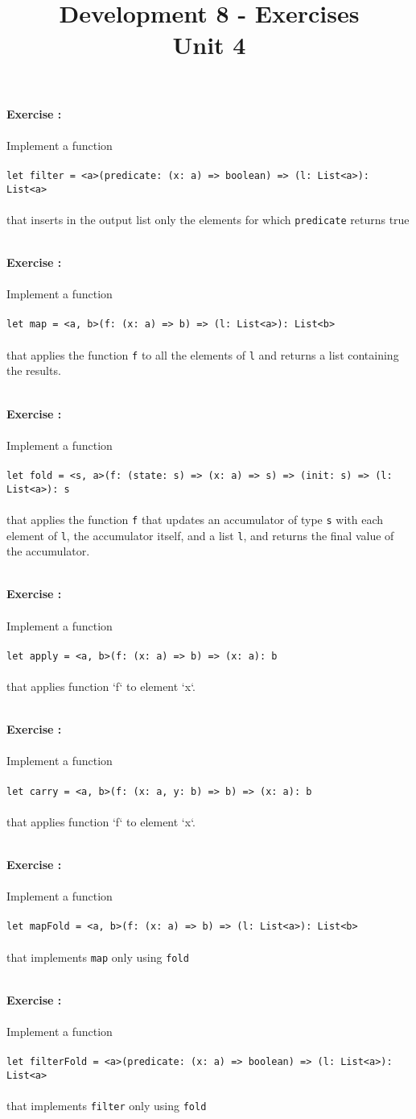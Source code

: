 \documentclass[]{article}
\title{Development 8 - Exercises\\Unit 4}
\author{}
\date{}
\newcounter{ExerciseCount}
\newcommand{\functionEx}[3]{
  Implement a function\\\\
   \texttt{let #1 = #2}\\\\ #3
}
\newcommand{\exercise}[1]{\noindent \textbf{Exercise \theExerciseCount:}\\\\ #1 \addtocounter{ExerciseCount}{1}
}
\begin{document}
\maketitle

\noindent


\exercise{
  \functionEx{filter}{<a>(predicate: (x: a) => boolean) => (l: List<a>): List<a>}{
    that inserts in the output list only the elements for which \texttt{predicate} returns true
}}\\

\exercise{
  \functionEx{map}{<a, b>(f: (x: a) => b) => (l: List<a>): List<b>}{
    that applies the function \texttt{f} to all the elements of \texttt{l} and returns a list containing the results.
}}\\

\exercise{
  \functionEx{fold}{<s, a>(f: (state: s) => (x: a) => s) => (init: s) => (l: List<a>): s}{
    that applies the function \texttt{f} that updates an accumulator of type \texttt{s} with each element of \texttt{l}, the accumulator itself, and a list \texttt{l}, and returns the final value of the accumulator.
}}\\

\exercise{
  \functionEx{apply}{<a, b>(f: (x: a) => b) => (x: a): b}{
    that applies function `f` to element `x`.
}}\\

\exercise{
  \functionEx{carry}{<a, b>(f: (x: a, y: b) => b) => (x: a): b}{
    that applies function `f` to element `x`.
}}\\

\exercise{
  \functionEx{mapFold}{<a, b>(f: (x: a) => b) => (l: List<a>): List<b>}{
    that implements \texttt{map} only using \texttt{fold}
}}\\

\exercise{
  \functionEx{filterFold}{<a>(predicate: (x: a) => boolean) => (l: List<a>): List<a>}{
    that implements \texttt{filter} only using \texttt{fold}
}}\\
\end{document}
